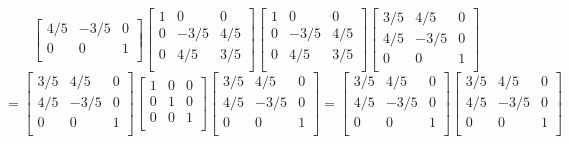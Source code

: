 \documentclass{article}
\begin{document}
\begin{enumerate}
\begin{enumerate}
{\[\begin{bmatrix}
        4/5 & -3/5 & 0 \\
        0 & 0 & 1\\
      \end{bmatrix}
      \begin{bmatrix} 
        1 & 0 & 0 \\ 
        0 & -3/5 & 4/5 \\
        0 & 4/5 & 3/5 \\
      \end{bmatrix}
      \begin{bmatrix} 
        1 & 0 & 0 \\ 
        0 & -3/5 & 4/5 \\
        0 & 4/5 & 3/5 \\
      \end{bmatrix}
      \begin{bmatrix}
        3/5 & 4/5 & 0 \\
        4/5 & -3/5 & 0 \\
        0 & 0 & 1\\
      \end{bmatrix} \] 
      \[ = 
      \begin{bmatrix}
        3/5 & 4/5 & 0 \\
        4/5 & -3/5 & 0 \\
        0 & 0 & 1\\
      \end{bmatrix}
      \begin{bmatrix} 
        1 & 0 & 0 \\ 
        0 & 1 & 0 \\
        0 & 0 & 1 \\
      \end{bmatrix}
      \begin{bmatrix}
        3/5 & 4/5 & 0 \\
        4/5 & -3/5 & 0 \\
        0 & 0 & 1\\
      \end{bmatrix}
      = 
      \begin{bmatrix}
        3/5 & 4/5 & 0 \\
        4/5 & -3/5 & 0 \\
        0 & 0 & 1\\
      \end{bmatrix}
      \begin{bmatrix}
        3/5 & 4/5 & 0 \\
        4/5 & -3/5 & 0 \\
        0 & 0 & 1\\

\end{bmatrix}\]}
\end{enumerate}
\end{enumerate}
\end{document}
